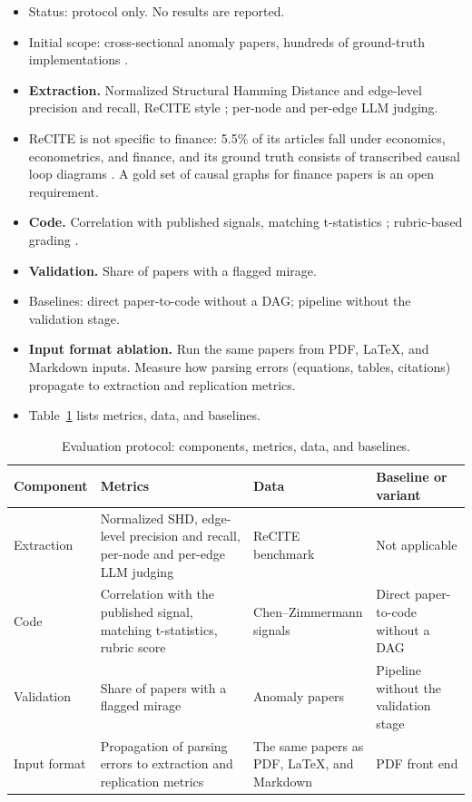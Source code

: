   \begin{itemize}
  \tightlist
  \item
    Status: protocol only. No results are reported.
  \item
    Initial scope: cross-sectional anomaly papers, hundreds of
    ground-truth implementations \cite{chen2022open}.
  \item
    \textbf{Extraction.} Normalized Structural Hamming Distance and
    edge-level precision and recall, ReCITE style \cite{saklad2025recite};
    per-node and per-edge LLM judging.
  \item
    ReCITE is not specific to finance: 5.5\% of its articles fall under
    economics, econometrics, and finance, and its ground truth consists of
    transcribed causal loop diagrams \cite{saklad2025recite}. A gold set of
    causal graphs for finance papers is an open requirement.
  \item
    \textbf{Code.} Correlation with published signals, matching
    t-statistics \cite{chen2022open}; rubric-based grading
    \cite{starace2025paperbench}.
  \item
    \textbf{Validation.} Share of papers with a flagged mirage.
  \item
    Baselines: direct paper-to-code without a DAG; pipeline without the
    validation stage.
  \item
    \textbf{Input format ablation.} Run the same papers from PDF, LaTeX,
    and Markdown inputs. Measure how parsing errors (equations, tables,
    citations) propagate to extraction and replication metrics.
  \item
    Table~\ref{tab:evaluation} lists metrics, data, and baselines.
  \end{itemize}

  \begin{table}[H]
    \centering
    \begin{tabularx}{\linewidth}{lXXX}
      \toprule
      Component & Metrics & Data & Baseline or variant \\
      \midrule
      Extraction & Normalized SHD, edge-level precision and recall, per-node
      and per-edge LLM judging & ReCITE benchmark & Not applicable \\
      Code & Correlation with the published signal, matching t-statistics,
      rubric score & Chen--Zimmermann signals & Direct paper-to-code without a
      DAG \\
      Validation & Share of papers with a flagged mirage & Anomaly papers &
      Pipeline without the validation stage \\
      Input format & Propagation of parsing errors to extraction and
      replication metrics & The same papers as PDF, LaTeX, and Markdown & PDF
      front end \\
      \bottomrule
    \end{tabularx}
    \caption{Evaluation protocol: components, metrics, data, and baselines.}
    \label{tab:evaluation}
  \end{table}

